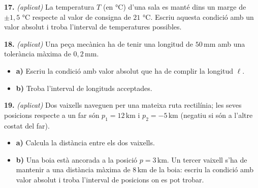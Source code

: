 \documentclass[13pt,a4paper]{extarticle}
\begin{document}
\par\noindent\begin{minipage}{\linewidth}
\textbf{17.} \emph{(aplicat)} La temperatura $T$ (en °C) d'una sala es manté dins un marge de $\pm 1{,}5$ °C respecte al valor de consigna de $21$ °C. Escriu aquesta condició amb un valor absolut i troba l'interval de temperatures possibles.\par
\end{minipage}\par\vspace{1.6mm}
\par\noindent\begin{minipage}{\linewidth}
\textbf{18.} \emph{(aplicat)} Una peça mecànica ha de tenir una longitud de $50\,\text{mm}$ amb una tolerància màxima de $0{,}2\,\text{mm}$.\par

\begin{itemize}[leftmargin=0pt,itemsep=3pt,topsep=3pt,parsep=0pt,label={}]
\item \textbf{a)} Escriu la condició amb valor absolut que ha de complir la longitud $\ell$.
\item \textbf{b)} Troba l'interval de longituds acceptades.
\end{itemize}
\end{minipage}\par\vspace{1.6mm}
\par\noindent\begin{minipage}{\linewidth}
\textbf{19.} \emph{(aplicat)} Dos vaixells naveguen per una mateixa ruta rectilínia; les seves posicions respecte a un far són $p_1=12\,\text{km}$ i $p_2=-5\,\text{km}$ (negatiu si són a l'altre costat del far).\par

\begin{itemize}[leftmargin=0pt,itemsep=3pt,topsep=3pt,parsep=0pt,label={}]
\item \textbf{a)} Calcula la distància entre els dos vaixells.
\item \textbf{b)} Una boia està ancorada a la posició $p=3\,\text{km}$. Un tercer vaixell s'ha de mantenir a una distància màxima de $8\,\text{km}$ de la boia: escriu la condició amb valor absolut i troba l'interval de posicions on es pot trobar.
\end{itemize}
\end{minipage}\par\vspace{1.6mm}
\end{document}
